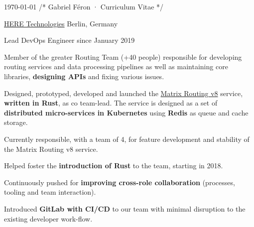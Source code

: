 \documentclass[10pt, a4paper]{awesome-cv}
\begin{document}
\makecvheader

\makecvfooter
{\today}
{/* Gabriel Féron · Curriculum Vitae */}
{\thepage}

\begin{cventries}
	\cventrytitle
	{\href{https://developer.here.com}{HERE Technologies}}
	{Berlin, Germany}

	\cventry
	{Lead DevOps Engineer}
	{since January 2019}
	{
		\begin{cvparagraph}
			Member of the greater Routing Team (+40 people) responsible for developing routing services and data processing pipelines as well as maintaining core libraries, \textbf{designing APIs} and fixing various issues.
		\end{cvparagraph}
		\begin{cvitems}
			\item {Designed, prototyped, developed and launched the \href{https://developer.here.com/documentation/large-matrix/api-reference-swagger.html}{Matrix Routing v8} service, \textbf{written in Rust}, as co team-lead.
			            The service is designed as a set of \textbf{distributed micro-services in Kubernetes} using \textbf{Redis} as queue and cache storage.}
			\item {Currently responsible, with a team of 4, for feature development and stability of the Matrix Routing v8 service.}
			\item {Helped foster the \textbf{introduction of Rust} to the team, starting in 2018.}
			\item {Continuously pushed for \textbf{improving cross-role collaboration} (processes, tooling and team interaction).}
			\item {Introduced \textbf{GitLab with CI/CD} to our team with minimal disruption to the existing developer work-flow.}
		\end{cvitems}
	}


\end{cventries}
\end{document}
